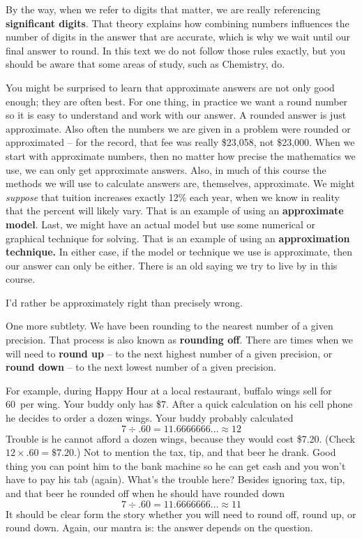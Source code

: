 By the way, when we refer to digits that matter, we are really referencing \textbf{significant digits}.  That theory explains how combining numbers influences the number of digits in the answer that are accurate, which is why we wait until our final answer to round.  In this text we do not follow those rules exactly, %
but you should be aware that some areas of study, such as Chemistry, do. 

You might be surprised to learn that approximate answers are not only good enough; they are often best.   For one thing, in practice we want a round number so it is easy to understand and work with our answer.  A rounded answer is just approximate. Also often the numbers we are given in a problem were rounded or approximated -- for the record, that fee was really \$23,058, not \$23,000. When we start with approximate numbers, then no matter how precise the mathematics we use, we can only get approximate answers.  Also, in much of this course the methods we will use to calculate answers are, themselves, approximate.  We might \emph{suppose} that tuition increases exactly 12\% each year, when we know in reality that the percent will likely vary.  That is an example of using an \textbf{approximate model}.  Last, we might have an actual model but use some numerical or graphical technique for solving.  That is an example of using an \textbf{approximation technique.}  In either case, if the model or technique we use is approximate, then our answer can only be either.
There is an old saying we try to live by in this course.
\begin{center}
I'd rather be approximately right than precisely wrong.
\end{center}

One more subtlety.  We have been rounding to the nearest number of a given precision.   That process is also known as \textbf{rounding off}.  There are times when we will need to \textbf{round up} -- to the next highest number of a given precision, or \textbf{round down} -- to the next lowest number of a given precision.  

For example, during Happy Hour at a local restaurant, buffalo wings sell for 60\textcent ~per wing.   Your buddy only has \$7.  After a quick calculation on his cell phone he decides to order a dozen wings.  Your buddy probably calculated $$7 \div .60 = 11.6666666\ldots \approx 12$$
Trouble is he cannot afford a dozen wings, because they would cost \$7.20.  
(Check $12 \times .60 = \$7.20 $.)
Not to mention the tax, tip, and that beer he drank.  Good thing you can point him to the bank machine so he can get cash and you won't have to pay his tab (again).  What's the trouble here? Besides ignoring tax, tip, and that beer he rounded off when he should have rounded down
 $$7 \div .60 = 11.6666666\ldots \approx 11$$
It should be clear form the story whether you will need to round off, round up, or round down. Again, our mantra is: the answer depends on the question.  

